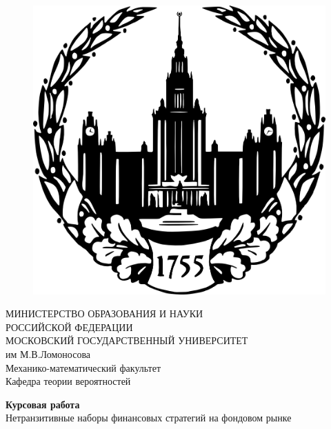 \begin{titlepage}
\begin{figure}[!htb]
    \centering
    \includegraphics[keepaspectratio=true,scale=1.2]{images/title/msu_logo.png}
\end{figure}

\begin{center}
    МИНИСТЕРСТВО ОБРАЗОВАНИЯ И НАУКИ \\РОССИЙСКОЙ ФЕДЕРАЦИИ
    \vspace{5mm}
    \\ \large{МОСКОВСКИЙ ГОСУДАРСТВЕННЫЙ УНИВЕРСИТЕТ\\ им М.В.Ломоносова}
    \vspace{5mm}
    \\Механико-математический факультет \\ Кафедра теории вероятностей
\end{center}

\vspace{15mm}
\begin{center}
    {\LARGE{\textbf{Курсовая работа} \\ \vspace{3mm} Нетранзитивные наборы финансовых стратегий на фондовом рынке }}
\end{center}
\vspace{30mm}


\end{titlepage}
